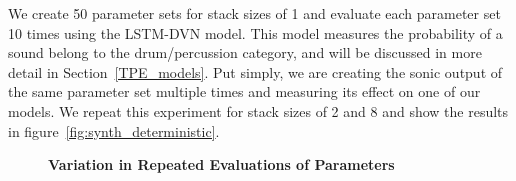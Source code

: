 \documentclass[\main/thesis.tex]{subfiles}
\begin{document}
We create 50 parameter sets for stack sizes of 1 and evaluate each parameter set 10 times using the LSTM-DVN model. This model measures the probability of a sound belong to the drum/percussion category, and will be discussed in more detail in Section~\ref{TPE_models}. Put simply, we are creating the sonic output of the same parameter set multiple times and measuring its effect on one of our models. We repeat this experiment for stack sizes of 2 and 8 and show the results in figure~\ref{fig:synth_deterministic}.

\begin{figure}[htbp!]
\begin{center}
    \textbf{ Variation in Repeated Evaluations of Parameters }\par\medskip

    
\end{center}
\end{figure}
\end{document}
